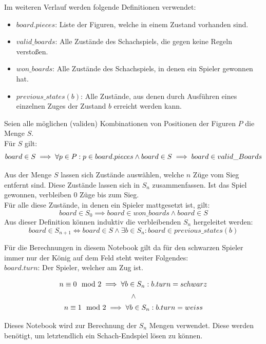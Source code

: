 \documentclass[a4paper,12pt]{article}
\begin{document}
Im weiteren Verlauf werden folgende Definitionen verwendet: 
\begin{itemize}
	\item \(board.pieces\): Liste der Figuren, welche in einem Zustand vorhanden sind. 
	\item \(valid\_boards\): Alle Zustände des Schachspiels, die gegen keine Regeln verstoßen. 
	\item \(won\_boards\): Alle Zustände des Schachspiels, in denen ein Spieler gewonnen hat. 
	\item \(previous\_states(b)\): Alle Zustände, aus denen durch Ausführen eines einzelnen Zuges der Zustand \(b\) erreicht werden kann.
\end{itemize}


Seien alle möglichen (validen) Kombinationen von Positionen der Figuren
\(P\) die Menge \(S\).\\
Für \(S\) gilt:\\
\[
board \in S \implies \forall p \in P : p \in board.pieces \\
\land \\
board \in S \implies board \in valid\_Boards
\]

Aus der Menge \(S\) lassen sich Zustände auswählen, welche \(n\) Züge
vom Sieg entfernt sind. Diese Zustände lassen sich in \(S_n\)
zusammenfassen. Ist das Spiel gewonnen, verbleiben 0 Züge bis zum
Sieg.\\
Für alle diese Zustände, in denen ein Spieler mattgesetzt ist, gilt:\\
\[
board \in S_0 \implies board \in won\_boards \land board \in S
\] Aus dieser Definition können induktiv die verbleibenden \(S_n\)
hergeleitet werden:\\
\[board \in S_{n+1} \iff board \in S \land \exists b \in S_n: board \in previous\_states(b)\]

Für die Berechnungen in diesem Notebook gilt da für den schwarzen
Spieler immer nur der König auf dem Feld steht weiter Folgendes:\\
\(board.turn\): Der Spieler, welcher am Zug ist.

\[
n \equiv 0 \mod 2 \implies \forall b \in S_n : b.turn = schwarz \\
\]
\[
\land 
\]
\[ 
n \equiv 1 \mod 2 \implies \forall b \in S_n : b.turn = weiss \\
\]

Dieses Notebook wird zur Berechnung der \(S_n\) Mengen verwendet. Diese
werden benötigt, um letztendlich ein Schach-Endspiel lösen zu können.
\end{document}
